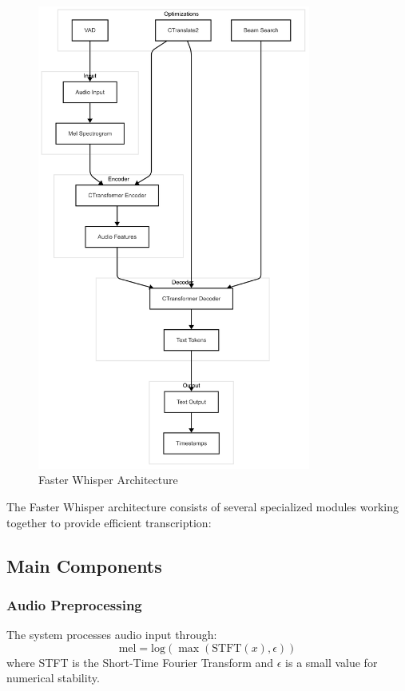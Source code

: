 \begin{figure}[H]
	\label{fig:whisper}
	\includegraphics[width=0.8\textwidth]{figuras/whisper.png}
	\caption{Faster Whisper Architecture}
\end{figure}

The Faster Whisper architecture consists of several specialized modules working together to provide efficient transcription:

\subsection{Main Components}
\label{subsec:main-components}

\subsubsection{Audio Preprocessing}
The system processes audio input through:
\begin{equation}
	\text{mel} = \text{log}(\max(\text{STFT}(x), \epsilon))
\end{equation}
where STFT is the Short-Time Fourier Transform and $\epsilon$ is a small value for numerical stability.

